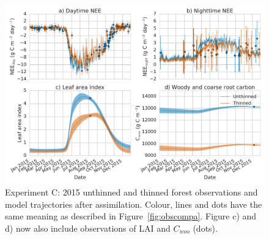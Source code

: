  \begin{figure}[ht]
    \centering
        \includegraphics[width=\textwidth]{chapter/chapter7/obs_compc.pdf}
\caption{Experiment C: 2015 unthinned and thinned forest observations and model trajectories after assimilation. Colour, lines and dots have the same meaning as described in Figure~\ref{fig:obscompa}. Figure c) and d) now also include observations of LAI and \(C_{woo}\) (dots).}
 \label{fig:obscompc}
 \end{figure}

